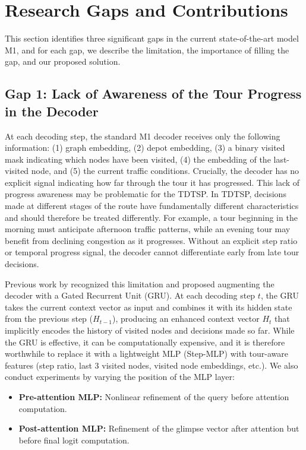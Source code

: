 \section{Research Gaps and Contributions}

This section identifies three significant gaps in the current state-of-the-art model
M1, and for each gap, we describe the limitation, the importance of filling the gap,
and our proposed solution.

\subsection{Gap 1: Lack of Awareness of the Tour Progress in the Decoder}

At each decoding step, the standard M1 decoder receives only the following information:
(1) graph embedding, (2) depot embedding, (3) a binary visited mask indicating which
nodes have been visited, (4) the embedding of the last-visited node, and (5) the
current traffic conditions. Crucially, the decoder has no explicit signal indicating
how far through the tour it has progressed. This lack of progress awareness may be
problematic for the TDTSP. In TDTSP, decisions made at different stages of the route
have fundamentally different characteristics and should therefore be treated differently.
For example, a tour beginning in the morning must anticipate afternoon traffic patterns,
while an evening tour may benefit from declining congestion as it progresses. Without an
explicit step ratio or temporal progress signal, the decoder cannot differentiate early
from late tour decisions.

Previous work by \citet{wu2021} recognized this limitation and proposed augmenting the
decoder with a Gated Recurrent Unit (GRU). At each decoding step $t$, the GRU takes
the current context vector as input and combines it with its hidden state from the
previous step ($H_{t-1}$), producing an enhanced context vector $H_t$ that implicitly
encodes the history of visited nodes and decisions made so far. While the GRU is
effective, it can be computationally expensive, and it is therefore worthwhile to
replace it with a lightweight MLP (Step-MLP) with tour-aware features (step ratio, last
3 visited nodes, visited node embeddings, etc.). We also conduct experiments by varying
the position of the MLP layer:

\begin{itemize}
    \item \textbf{Pre-attention MLP:} Nonlinear refinement of the query before
    attention computation.
    \item \textbf{Post-attention MLP:} Refinement of the glimpse vector after attention
    but before final logit computation.
\end{itemize}

